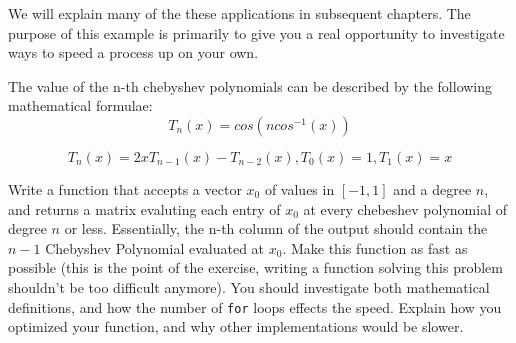 We will explain many of the these applications in subsequent chapters. The purpose of this example is primarily to give you a real opportunity to investigate ways to speed a process up on your own.

The value of the n-th chebyshev polynomials can be described by the following mathematical formulae\footnotemark :
\[
T_n(x) = cos(n cos^{-1}(x))
\]

\[
T_n(x) = 2xT_{n-1}(x) - T_{n-2}(x), T_0(x) = 1, T_1(x) = x
\]


\begin{problem}
Write a function that accepts a vector $x_0$ of values in $[-1,1]$ and a degree $n$, and returns a matrix evaluting each entry of $x_0$ at every chebeshev polynomial of degree $n$ or less. Essentially, the n-th column of the output should contain the $n-1$ Chebyshev Polynomial evaluated at $x_0$. Make this function as fast as possible (this is the point of the exercise, writing a function solving this problem shouldn't be too difficult anymore). You should investigate both mathematical definitions, and how the number of {\tt for} loops effects the speed. Explain how you optimized your function, and why other implementations would be slower.
\end{problem}
